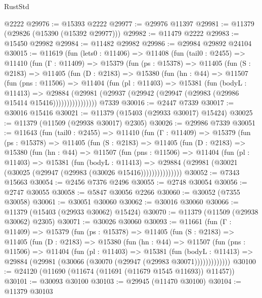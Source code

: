 \begin{lexlean}{RustStd}
\begin{coremodule}
    @2222
@29976 := @15393 @2222
@29977 := @29976 @11397
@29981 := @11379 (@29826 (@15390 (@15392 @29977)))
@29982 := @11479 @2222
@29983 := @15450 @29982
@29984 := @11482 @29982
@29986 := @29984 @29892 @24104
@30015 := @11619
    (fun (lets0 : @11406) =>
    @11408
      (fun (tail0 : @2455) =>
      @11410
        (fun (Γ : @11409) =>
        @15379
          (fun (ps : @15378) =>
          @11405
            (fun (S : @2183) =>
            @11405
              (fun (D : @2183) =>
              @15380
                (fun (hn : @44) =>
                @11507
                  (fun (pns : @11506) =>
                  @11404
                    (fun (pl : @11403) =>
                    @15381
                      (fun (bodyL : @11413) =>
                      @29884
                        (@29981
                          (@29937 (@29942 (@29947 (@29983 (@29986 @15414 @15416))))))))))))))))
    @7339
@30016 := @2447 @7339
@30017 := @30016 @15416
@30021 := @11379 (@15403 (@29933 @30017) @15424)
@30025 := @11379 (@11509 (@29938 @30017) @2305)
@30026 := @29986 @7339
@30051 := @11643
    (fun (tail0 : @2455) =>
    @11410
      (fun (Γ : @11409) =>
      @15379
        (fun (ps : @15378) =>
        @11405
          (fun (S : @2183) =>
          @11405
            (fun (D : @2183) =>
            @15380
              (fun (hn : @44) =>
              @11507
                (fun (pns : @11506) =>
                @11404
                  (fun (pl : @11403) =>
                  @15381
                    (fun (bodyL : @11413) =>
                    @29884 (@29981 (@30021 (@30025 (@29947 (@29983 (@30026 @15416)))))))))))))))
@30052 := @7343 @15663
@30054 := @2456 @7376 @2496
@30055 := @2748 @30054
@30056 := @2747 @30055
@30058 := @5847 @30056 @2266
@30060 := @30052 (@7355 @30058)
@30061 := @30051 @30060
@30062 := @30016 @30060
@30066 := @11379 (@15403 (@29933 @30062) @15424)
@30070 := @11379 (@11509 (@29938 @30062) @2305)
@30071 := @30026 @30060
@30093 := @11661
    (fun (Γ : @11409) =>
    @15379
      (fun (ps : @15378) =>
      @11405
        (fun (S : @2183) =>
        @11405
          (fun (D : @2183) =>
          @15380
            (fun (hn : @44) =>
            @11507
              (fun (pns : @11506) =>
              @11404
                (fun (pl : @11403) =>
                @15381
                  (fun (bodyL : @11413) =>
                  @29884 (@29981 (@30066 (@30070 (@29947 (@29983 @30071)))))))))))))
@30100 := @24120 (@11690 (@11674 (@11691 (@11679 @1545 @11693)) @11457))
@30101 := @30093 @30100
@30103 := @29945 (@11470 @30100)
@30104 := @11379 @30103

\end{coremodule}
\end{lexlean}
